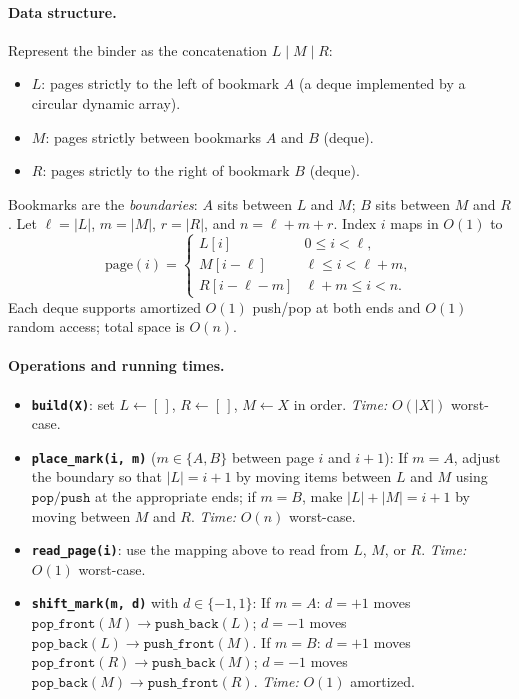 \documentclass[12pt,twoside]{article}
\begin{document}
\begin{problems}
\newpage
\problem  %
\paragraph{Data structure.}
Represent the binder as the concatenation \(L \mid M \mid R\):
\begin{itemize}
  \item \(L\): pages strictly to the left of bookmark \(A\) (a deque implemented by a circular dynamic array).
  \item \(M\): pages strictly between bookmarks \(A\) and \(B\) (deque).
  \item \(R\): pages strictly to the right of bookmark \(B\) (deque).
\end{itemize}
Bookmarks are the \emph{boundaries}: \(A\) sits between \(L\) and \(M\); \(B\) sits between \(M\) and \(R\).
Let \(\ell=|L|\), \(m=|M|\), \(r=|R|\), and \(n=\ell+m+r\).
Index \(i\) maps in \(O(1)\) to
\[
\text{page}(i)=
\begin{cases}
L[i] & 0\le i<\ell,\\
M[i-\ell] & \ell\le i<\ell+m,\\
R[i-\ell-m] & \ell+m\le i<n.
\end{cases}
\]
Each deque supports amortized \(O(1)\) push/pop at both ends and \(O(1)\) random access; total space is \(O(n)\).

\paragraph{Operations and running times.}
\begin{itemize}
  \item \textbf{\texttt{build(X)}}: set \(L\gets[\,]\), \(R\gets[\,]\), \(M\gets X\) in order. 
        \emph{Time:} \(O(|X|)\) worst-case.

  \item \textbf{\texttt{place\_mark(i, m)}} (\(m\in\{A,B\}\) between page \(i\) and \(i+1\)):
        If \(m=A\), adjust the boundary so that \(|L|=i+1\) by moving items between \(L\) and \(M\)
        using \(\texttt{pop/push}\) at the appropriate ends; if \(m=B\), make \(|L|+|M|=i+1\) by moving between \(M\) and \(R\).
        \emph{Time:} \(O(n)\) worst-case.

  \item \textbf{\texttt{read\_page(i)}}: use the mapping above to read from \(L\), \(M\), or \(R\).
        \emph{Time:} \(O(1)\) worst-case.

  \item \textbf{\texttt{shift\_mark(m, d)}} with \(d\in\{-1,1\}\):
        If \(m=A\): 
        \(d=+1\) moves \(\texttt{pop\_front}(M)\to\texttt{push\_back}(L)\);
        \(d=-1\) moves \(\texttt{pop\_back}(L)\to\texttt{push\_front}(M)\).
        If \(m=B\): 
        \(d=+1\) moves \(\texttt{pop\_front}(R)\to\texttt{push\_back}(M)\);
        \(d=-1\) moves \(\texttt{pop\_back}(M)\to\texttt{push\_front}(R)\).
        \emph{Time:} \(O(1)\) amortized.


\end{itemize}
\end{problems}
\end{document}
